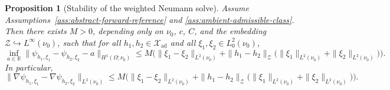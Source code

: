 \documentclass{article}
\newtheorem{proposition}[theorem]{Proposition}
\theoremstyle{definition}
\begin{document}
\begin{proposition}[Stability of the weighted Neumann solve]
    \label{prop:ambient-neumann-stability}
    Assume Assumptions~\ref{ass:abstract-forward-reference} and
    \ref{ass:ambient-admissible-class}. Then there exists \(M>0\), depending only on
    \(\nu_0\), \(c\), \(C\), and the embedding \(\mathcal Z\hookrightarrow L^\infty(\nu_0)\), such
    that for all \(h_1,h_2\in\mathcal X_{\mathrm{ad}}\) and all \(\xi_1,\xi_2\in L^2_0(\nu_0)\),
    \begin{equation}
        \label{eq:ambient-neumann-stability-estimate}
        \inf_{a\in\mathbb R}
        \|\psi_{h_1,\xi_1}-\psi_{h_2,\xi_2}-a\|_{H^1(\Omega;\nu_0)}
        \le
        M\Big(
        \|\xi_1-\xi_2\|_{L^2(\nu_0)}
        +
        \|h_1-h_2\|_{\mathcal Z}
        \bigl(\|\xi_1\|_{L^2(\nu_0)}+\|\xi_2\|_{L^2(\nu_0)}\bigr)
        \Big).
    \end{equation}
    In particular,
    \begin{equation}
        \label{eq:ambient-neumann-gradient-stability}
        \|\nabla\psi_{h_1,\xi_1}-\nabla\psi_{h_2,\xi_2}\|_{L^2(\nu_0)}
        \le
        M\Big(
        \|\xi_1-\xi_2\|_{L^2(\nu_0)}
        +
        \|h_1-h_2\|_{\mathcal Z}
        \bigl(\|\xi_1\|_{L^2(\nu_0)}+\|\xi_2\|_{L^2(\nu_0)}\bigr)
        \Big).
    \end{equation}
\end{proposition}
\end{document}
